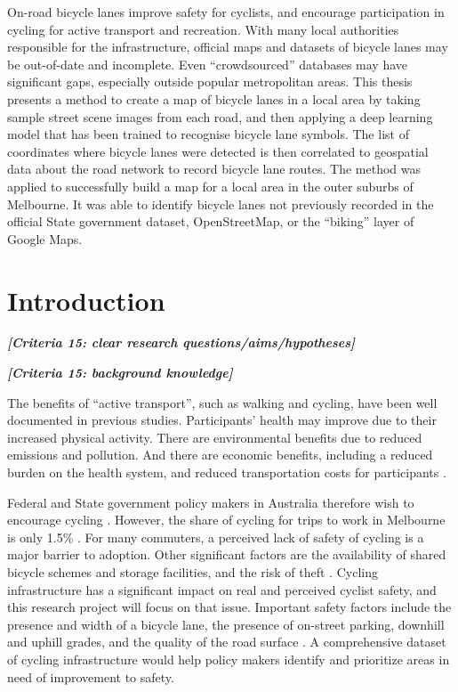 \documentclass[11pt,twoside]{report}
\newcommand{\remark}[1]{{\bf \em [\marginpar{$\Leftarrow$}#1]}}
\begin{document}
On-road bicycle lanes improve safety for cyclists, and encourage participation in cycling for active transport and recreation.  With many local authorities responsible for the infrastructure, official maps and datasets of bicycle lanes may be out-of-date and incomplete.  Even ``crowdsourced'' databases may have significant gaps, especially outside popular metropolitan areas.  This thesis presents a method to create a map of bicycle lanes in a local area by taking sample street scene images from each road,  and then applying a deep learning model that has been trained to recognise bicycle lane symbols.  The list of coordinates where bicycle  lanes were detected is then correlated to geospatial data about the road network to record bicycle lane routes.  The method was applied to successfully build a map for a local area in the outer suburbs of Melbourne.  It was able to identify bicycle lanes not previously recorded in the official State government dataset, OpenStreetMap, or the ``biking'' layer of Google Maps.


\tableofcontents
\listoffigures
\listoftables


\chapter{Introduction}

\remark{Criteria 15: clear research questions/aims/hypotheses}

\remark{Criteria 15: background knowledge}

The benefits of ``active transport'', such as walking and cycling, have been well documented in previous studies.  Participants' health may improve due to their increased physical activity.  There are environmental benefits due to reduced emissions and pollution.  And there are economic benefits, including a reduced burden on the health system, and reduced transportation costs for participants \cite{LEE2012219} \cite{RABL2012121}.

Federal and State government policy makers in Australia therefore wish to encourage cycling \cite{federal_policy_2019} \cite{state_policy_2020}.  However, the share of cycling for trips to work in Melbourne is only 1.5\% \cite{melbactive}.  For many commuters, a perceived lack of safety of cycling is a major barrier to adoption.  Other significant factors are the availability of shared bicycle schemes and storage facilities, and the risk of theft \cite{WILSON2018234}.  Cycling infrastructure has a significant impact on real and perceived cyclist safety, and this research project will focus on that issue.  Important safety factors include the presence and width of a bicycle lane, the presence of on-street parking, downhill and uphill grades, and the quality of the road surface \cite{BIKESAFETY} \cite{Teschke2012}.  A comprehensive dataset of cycling infrastructure would help policy makers identify and prioritize areas in need of improvement to safety.
\end{document}
